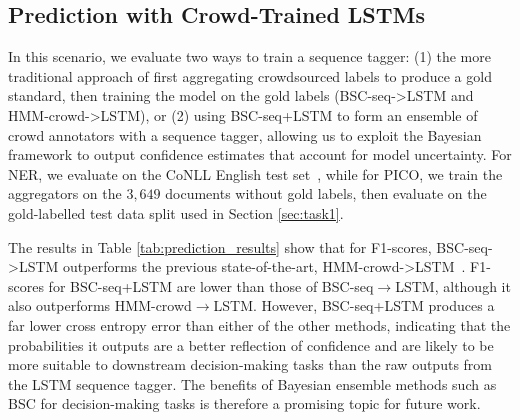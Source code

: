 \subsection{Prediction with Crowd-Trained LSTMs}\label{sec:task2}

In this scenario, we evaluate two ways to train a sequence tagger: (1) the more
traditional approach of first aggregating crowdsourced labels
to produce a gold standard, then training the model on the gold labels (BSC-seq->LSTM and HMM-crowd->LSTM),
or (2) using BSC-seq+LSTM to form an ensemble of crowd annotators with a sequence tagger, 
allowing us to exploit the Bayesian framework to output confidence estimates
that account for model uncertainty.
For NER, we evaluate on the CoNLL English test set~\cite{tjong2003introduction},
while for PICO, we train the aggregators on the $3,649$ documents without gold labels, 
then evaluate on the gold-labelled test data split used in Section \ref{sec:task1}.

The results in Table \ref{tab:prediction_results} show that for F1-scores, BSC-seq->LSTM 
outperforms 
the previous state-of-the-art, HMM-crowd->LSTM~\cite{nguyen2017aggregating}.
F1-scores  for BSC-seq+LSTM are lower than those of BSC-seq$\rightarrow$LSTM,
although it also outperforms
HMM-crowd$\rightarrow$LSTM.
However, BSC-seq+LSTM produces a far lower cross entropy error than either of the other methods, 
indicating that the probabilities it outputs are a better reflection of confidence and
are likely to be more suitable to downstream decision-making tasks than the raw outputs
from the LSTM sequence tagger.  The benefits of Bayesian ensemble methods
such as BSC for decision-making tasks is therefore a promising topic for future work.
